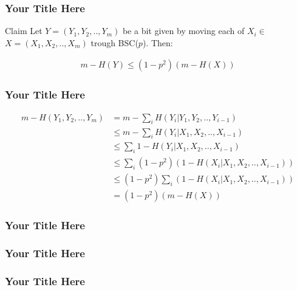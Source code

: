 \documentclass{beamer}
\begin{document}
\begin{frame}
  \frametitle{Your Title Here}
  
\begin{block}{Claim}
  Let $Y = \left(Y_{1}, Y_{2}, .., Y_{m}\right)$ be a bit given by moving each of $X_i \in$ $X = \left(X_{1}, X_{2}, .., X_{m}\right)$  trough BSC($p$). Then:

  \begin{equation*}
    \begin{split}
      m - H(Y) \le \left( 1 - p^{2} \right)\left( m - H(X) \right)
    \end{split}
  \end{equation*}
\end{block}

\end{frame}
\begin{frame}
  \frametitle{Your Title Here}
  
  \begin{equation*}
    \begin{split}
      m - H\left( Y_{1}, Y_{2}, .., Y_{m} \right) &= m - \sum_{i} H\left( Y_{i} | Y_{1}, Y_{2}, .., Y_{i-1} \right) \\ 
      & \le m - \sum_{i} H\left( Y_{i} | X_{1}, X_{2}, .., X_{i-1} \right) \\ 
      & \le \sum_{i} 1 - H\left( Y_{i} | X_{1}, X_{2}, .., X_{i-1} \right) \\ 
      & \le \sum_{i} \left( 1 - p^{2} \right)\left(1 - H\left( X_{i} | X_{1}, X_{2}, .., X_{i-1} \right)\right) \\ 
      & \le \left( 1 - p^{2} \right) \sum_{i} \left(1 - H\left( X_{i} | X_{1}, X_{2}, .., X_{i-1} \right)\right)  \\
      &= \left( 1 - p^{2} \right) \left( m - H\left( X \right) \right)
    \end{split}
  \end{equation*}
\end{frame}
\begin{frame}
  \frametitle{Your Title Here}
\end{frame}
\begin{frame}
  \frametitle{Your Title Here}
\end{frame}
\begin{frame}
  \frametitle{Your Title Here}
\end{frame}
\end{document}
